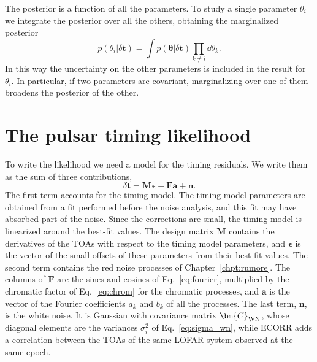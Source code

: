 The posterior is a function of all the parameters. To study a single parameter
$\theta_i$ we integrate the posterior over all the others, obtaining the
marginalized posterior
\begin{equation}
    p(\theta_i|\delta\bm{t}) = \int p(\bm{\theta}|\delta\bm{t})
    \prod_{k\neq i}\dd\theta_k .
    \label{eq:marginal}
\end{equation}
In this way the uncertainty on the other parameters is included in the result
for $\theta_i$. In particular, if two parameters are covariant, marginalizing
over one of them broadens the posterior of the other.

\section{The pulsar timing likelihood} \label{sec:likelihood}

To write the likelihood we need a model for the timing residuals. We write
them as the sum of three contributions,
\begin{equation}
    \delta\bm{t} = \bm{M}\bm{\epsilon} + \bm{F}\bm{a} + \bm{n}.
    \label{eq:modello_residui}
\end{equation}
The first term accounts for the timing model. The timing model parameters are
obtained from a fit performed before the noise analysis, and this fit may have
absorbed part of the noise. Since the corrections are small, the timing model
is linearized around the best-fit values. The design matrix $\bm{M}$ contains
the derivatives of the TOAs with respect to the timing model parameters, and
$\bm{\epsilon}$ is the vector of the small offsets of these parameters from
their best-fit values. The second term contains the red noise processes of
Chapter~\ref{chpt:rumore}. The columns of $\bm{F}$ are the sines and cosines of
Eq.~\eqref{eq:fourier}, multiplied by the chromatic factor of
Eq.~\eqref{eq:chrom} for the chromatic processes, and $\bm{a}$ is the vector of
the Fourier coefficients $a_k$ and $b_k$ of all the processes. The last term,
$\bm{n}$, is the white noise. It is Gaussian with covariance matrix
$\bm{C}_{\rm WN}$, whose diagonal elements are the variances $\sigma_i^2$ of
Eq.~\eqref{eq:sigma_wn}, while ECORR adds a correlation between the TOAs of
the same LOFAR system observed at the same epoch.


